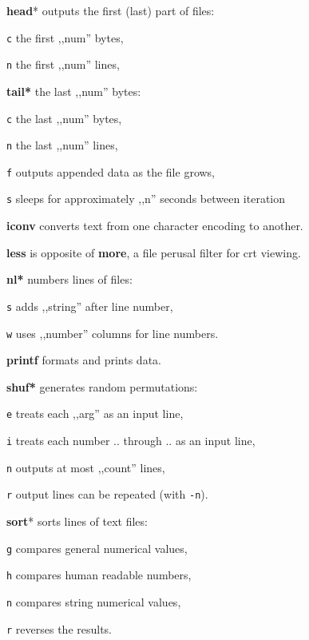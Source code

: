 \begin{enumx}
	\item [\cmd] \textbf{head}* outputs the first (last) part of files:
	\item [\texttt{c}] the first ,,num'' bytes,
	\item [\texttt{n}] the first ,,num'' lines,
	\item [\cmd] \textbf{tail*} the last ,,num'' bytes:
	\item [\texttt{c}] the last ,,num'' bytes,
	\item [\texttt{n}] the last ,,num'' lines,
	\item [\texttt{f}] outputs appended data as the file grows,
	\item [\texttt{s}] sleeps for approximately ,,n'' seconds between iteration 
\end{enumx}

\textbf{iconv} converts text from one character encoding to another.

\textbf{less} is opposite of \textbf{more}, a file perusal filter for crt viewing.

\begin{enumx}
	\item [\cmd] \textbf{nl*} numbers lines of files:
	\item [\texttt{s}] adds ,,string'' after line number,
	\item [\texttt{w}] uses ,,number'' columns for line numbers.
\end{enumx}

\textbf{printf} formats and prints data.

\begin{enumx}
	\item [\cmd] \textbf{shuf*} generates random permutations:
	\item [\texttt{e}] treats each ,,arg'' as an input line,
	\item [\texttt{i}] treats each number .. through .. as an input line, 
	\item [\texttt{n}] outputs at most ,,count'' lines,
	\item [\texttt{r}] output lines can be repeated (with \texttt{-n}).
\end{enumx}

\begin{enumx}
	\item [\cmd] \textbf{sort}* sorts lines of text files:
	\item [\texttt{g}] compares general numerical values,
	\item [\texttt{h}] compares human readable numbers,
	\item [\texttt{n}] compares string numerical values,
	\item [\texttt{r}] reverses the results.
\end{enumx}

